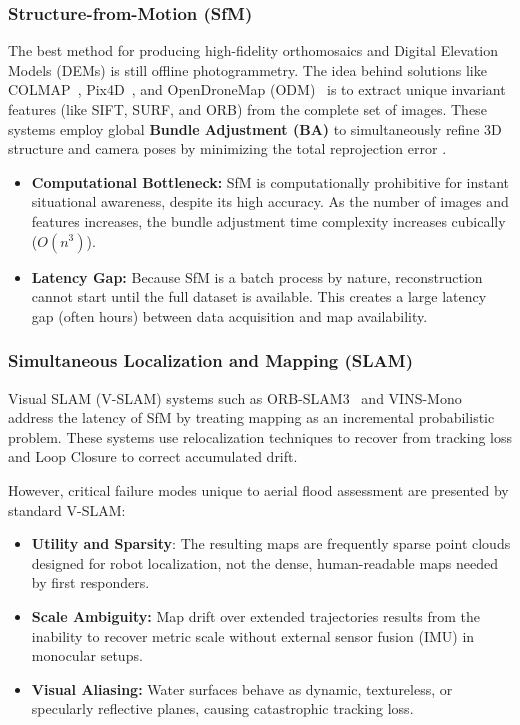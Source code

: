 \documentclass[conference]{IEEEtran}
\begin{document}
\subsubsection{Structure-from-Motion (SfM)}
The best method for producing high-fidelity orthomosaics and Digital Elevation Models (DEMs) is still offline photogrammetry. The idea behind solutions like COLMAP~\cite{colmap}, Pix4D~\cite{pix4d}, and OpenDroneMap (ODM)~\cite{odm} is to extract unique invariant features (like SIFT, SURF, and ORB) from the complete set of images. These systems employ global \textbf{Bundle Adjustment (BA)} to simultaneously refine 3D structure and camera poses by minimizing the total reprojection error \cite{snavely2006photo}.
\begin{itemize}
    \item \textbf{Computational Bottleneck:} SfM is computationally prohibitive for instant situational awareness, despite its high accuracy. As the number of images and features increases, the bundle adjustment time complexity increases cubically ($O(n^3)$).
    \item \textbf{Latency Gap:} Because SfM is a batch process by nature, reconstruction cannot start until the full dataset is available. This creates a large latency gap (often hours) between data acquisition and map availability.
\end{itemize}

\subsubsection{Simultaneous Localization and Mapping (SLAM)}
Visual SLAM (V-SLAM) systems such as ORB-SLAM3~\cite{orbslam3} and VINS-Mono~\cite{vinsmono} address the latency of SfM by treating mapping as an incremental probabilistic problem. These systems use relocalization techniques to recover from tracking loss and Loop Closure to correct accumulated drift.

However, critical failure modes unique to aerial flood assessment are presented by standard V-SLAM:
\begin{itemize}
    \item \textbf{Utility and Sparsity}: The resulting maps are frequently sparse point clouds designed for robot localization, not the dense, human-readable maps needed by first responders.
    \item \textbf{Scale Ambiguity:} Map drift over extended trajectories results from the inability to recover metric scale without external sensor fusion (IMU) in monocular setups.
    \item \textbf{Visual Aliasing:} Water surfaces behave as dynamic, textureless, or specularly reflective planes, causing catastrophic tracking loss.
\end{itemize}
\end{document}
